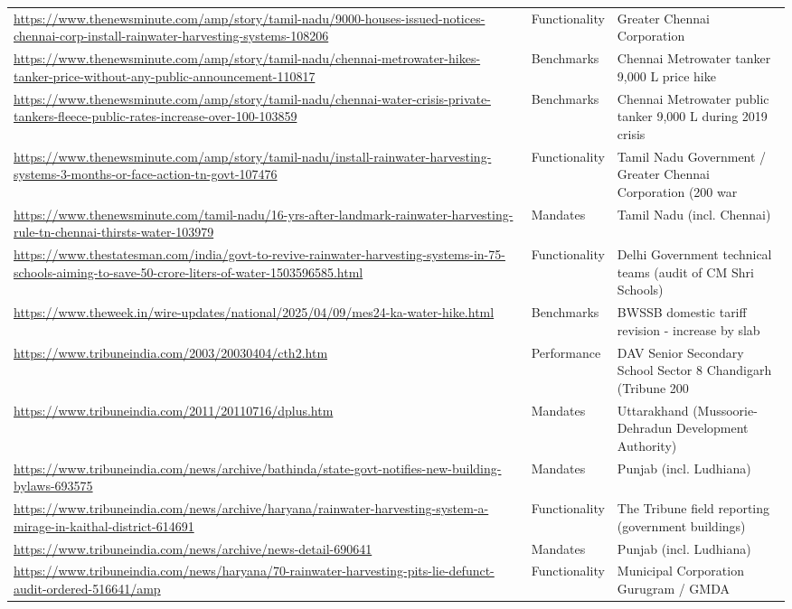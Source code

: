 {\begin{longtable}{p{9.2cm} p{2.5cm} p{4.2cm}}
\url{https://www.thenewsminute.com/amp/story/tamil-nadu/9000-houses-issued-notices-chennai-corp-install-rainwater-harvesting-systems-108206} & Functionality & Greater Chennai Corporation\\
\url{https://www.thenewsminute.com/amp/story/tamil-nadu/chennai-metrowater-hikes-tanker-price-without-any-public-announcement-110817} & Benchmarks & Chennai Metrowater tanker 9,000 L price hike\\
\url{https://www.thenewsminute.com/amp/story/tamil-nadu/chennai-water-crisis-private-tankers-fleece-public-rates-increase-over-100-103859} & Benchmarks & Chennai Metrowater public tanker 9,000 L during 2019 crisis\\
\url{https://www.thenewsminute.com/amp/story/tamil-nadu/install-rainwater-harvesting-systems-3-months-or-face-action-tn-govt-107476} & Functionality & Tamil Nadu Government / Greater Chennai Corporation (200 war\\
\url{https://www.thenewsminute.com/tamil-nadu/16-yrs-after-landmark-rainwater-harvesting-rule-tn-chennai-thirsts-water-103979} & Mandates & Tamil Nadu (incl. Chennai)\\
\url{https://www.thestatesman.com/india/govt-to-revive-rainwater-harvesting-systems-in-75-schools-aiming-to-save-50-crore-liters-of-water-1503596585.html} & Functionality & Delhi Government technical teams (audit of CM Shri Schools)\\
\url{https://www.theweek.in/wire-updates/national/2025/04/09/mes24-ka-water-hike.html} & Benchmarks & BWSSB domestic tariff revision - increase by slab\\
\url{https://www.tribuneindia.com/2003/20030404/cth2.htm} & Performance & DAV Senior Secondary School Sector 8 Chandigarh (Tribune 200\\
\url{https://www.tribuneindia.com/2011/20110716/dplus.htm} & Mandates & Uttarakhand (Mussoorie-Dehradun Development Authority)\\
\url{https://www.tribuneindia.com/news/archive/bathinda/state-govt-notifies-new-building-bylaws-693575} & Mandates & Punjab (incl. Ludhiana)\\
\url{https://www.tribuneindia.com/news/archive/haryana/rainwater-harvesting-system-a-mirage-in-kaithal-district-614691} & Functionality & The Tribune field reporting (government buildings)\\
\url{https://www.tribuneindia.com/news/archive/news-detail-690641} & Mandates & Punjab (incl. Ludhiana)\\
\url{https://www.tribuneindia.com/news/haryana/70-rainwater-harvesting-pits-lie-defunct-audit-ordered-516641/amp} & Functionality & Municipal Corporation Gurugram / GMDA\\

\end{longtable}}
